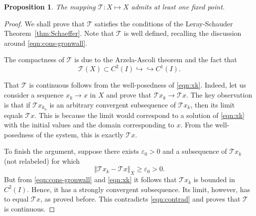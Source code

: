 \documentclass[10pt,a4paper]{amsart}
\newtheorem{proposition}{Proposition}
\begin{document}
\begin{proposition}
The mapping $ \mathcal{T}:X \mapsto X$ admits at least one fixed point.
\end{proposition}

\begin{proof}
We shall prove that $\mathcal{T}$ satisfies the conditions of the  Leray-Schauder Theorem~\ref{thm:Schaeffer}. Note that $\mathcal{T}$ is well defined, recalling the discussion around \eqref{eqn:cons-gronwall}.

The compactness of $\mathcal{T}$ is due to the Arzela-Ascoli theorem and the fact that
\[
\mathcal{T}\left(X\right)\subset C^{2}\left(I\right)\hookrightarrow\hookrightarrow C^{1}\left(I\right).
\] 

That $\mathcal{T}$ is continuous follows from the well-posedness of \eqref{eqn:xk}. 
Indeed, let us consider a sequence $x_{k}\to x$ in $X$ and prove that $\mathcal{T}x_{k}\to\mathcal{T}x$.
The key observation is that if $\mathcal{T}x_{k_{n}}$ is an arbitrary convergent subsequence of $\mathcal{T}x_{k}$, then its limit equals $\mathcal{T}x$. This is because the limit would correspond to a solution of \eqref{eqn:xk} with the initial values and the domain corresponding to $x$. From the well-posedness of the system, this is exactly $\mathcal{T}x$.

To finish the argument, suppose there exists $\varepsilon_0>0$ and a subsequence of $\mathcal{T}x_{k}$ (not relabeled) for which 
\begin{equation}\label{eqn:contrad}
\left\Vert \mathcal{T}x_{k}-\mathcal{T}x\right\Vert _{X}\ge\varepsilon_{0}>0.
\end{equation}
But from \eqref{eqn:cons-gronwall} and \eqref{eqn:xk} it follows that $\mathcal{T}x_{k}$ is bounded in $C^{2}\left(I\right)$. Hence, it has a strongly convergent subsequence. Its limit, however, has to equal $\mathcal{T}x$, as proved before. This contradicts \eqref{eqn:contrad} and proves that $\mathcal{T}$ is continuous.


\end{proof}
\end{document}
